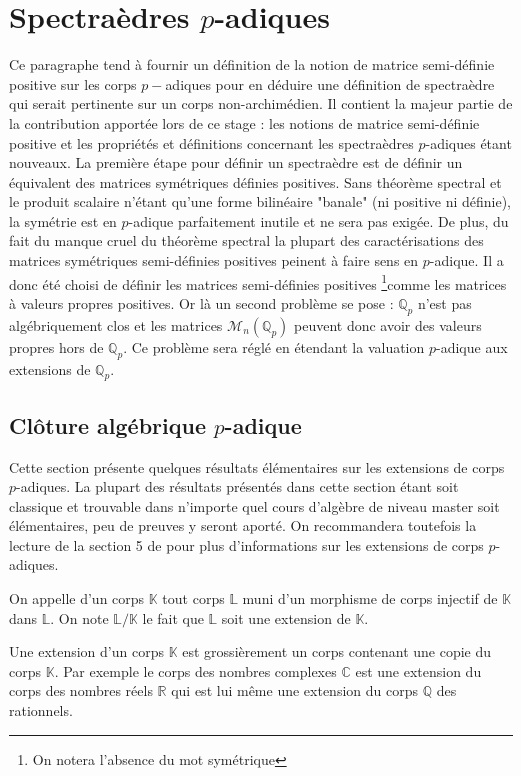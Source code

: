 \newcommand\mat{matrice semi-définie positive } 
\newcommand\Mat{Matrice semi-définie positive }
\newcommand\mats{matrices semi-définies positives }
\newcommand\Mats{Matrices semi-définies positives }


\section{Spectraèdres \texorpdfstring{$p$}{p}-adiques } 
\label{sec:spectraedre} 
Ce paragraphe tend à fournir un définition de la notion de \mat sur les corps $p-$adiques pour en déduire une définition de spectraèdre qui serait pertinente sur un corps non-archimédien. Il contient la majeur partie de la contribution apportée lors de ce stage : les notions de matrice semi-définie positive et les propriétés et définitions concernant les spectraèdres $p$-adiques étant nouveaux. 
La première étape pour définir un spectraèdre est de définir un équivalent des matrices symétriques définies positives. Sans théorème spectral et le produit scalaire n'étant qu'une forme bilinéaire "banale" (ni positive ni définie), la symétrie est en $p$-adique parfaitement inutile et ne sera pas exigée. De plus, du fait du manque cruel du théorème spectral la plupart des caractérisations des matrices symétriques semi-définies positives peinent à faire sens en $p$-adique. 
Il a donc été choisi de définir les \mats \footnote{On notera l'absence du mot symétrique}comme les matrices à valeurs propres positives.
Or là un second problème se pose : $\mathbb{Q}_{p} $ n'est pas algébriquement clos et les matrices $\mathcal{M}_n\left( \mathbb{Q}_{p}  \right) $ peuvent donc avoir des valeurs propres hors de $\mathbb{Q}_{p}$. Ce problème sera réglé en étendant la valuation $p$-adique aux extensions de $\mathbb{Q}_{p} $.

\subsection{Clôture algébrique \texorpdfstring{$p$}{p}-adique } 
Cette section présente quelques résultats élémentaires sur les extensions de corps $p$-adiques. La plupart des résultats présentés dans cette section étant soit classique et trouvable dans n'importe quel cours d'algèbre de niveau master soit élémentaires, peu de preuves y seront aporté. On recommandera toutefois la lecture de la section 5 de \parencite{gouvea_p-adic_2003} pour plus d'informations sur les extensions de corps $p$-adiques. 

\begin{definition}
	On appelle  d'un corps $\mathbb{K}$ tout corps $\mathbb{L}$ muni d'un morphisme de corps injectif de $\mathbb{K}$ dans $\mathbb{L}$. On note $\mathbb{L}/\mathbb{K}$ le fait que $\mathbb{L}$ soit une extension de $\mathbb{K}.$
\end{definition}
Une extension d'un corps $\mathbb{K}$ est grossièrement un corps contenant une copie du corps $\mathbb{K}$. Par exemple le corps des nombres complexes $\mathbb{C}$ est une extension du corps des nombres réels $\mathbb{R}$ qui est lui même une extension du corps $\mathbb{Q}$ des rationnels.


